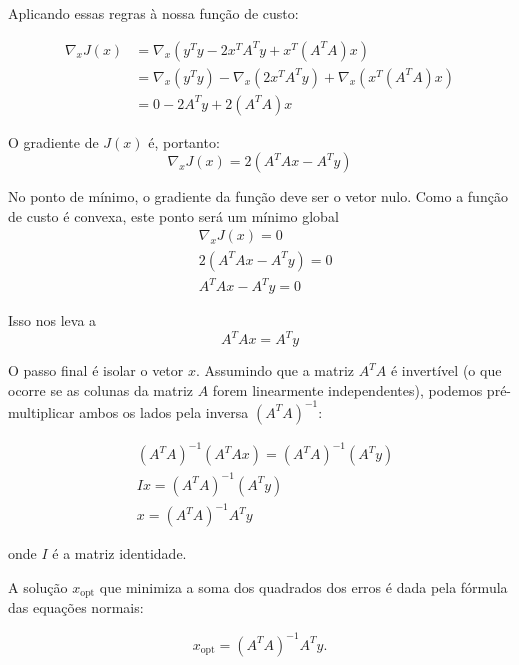 	Aplicando essas regras à nossa função de custo:
	
	\begin{align*}
		\nabla_x J(x) &= \nabla_x (y^T y - 2x^T A^T y + x^T (A^T A) x) \\
		&= \nabla_x(y^T y) - \nabla_x(2x^T A^T y) + \nabla_x(x^T (A^T A) x) \\
		&= 0 - 2A^T y + 2(A^T A)x
	\end{align*}
	
	O gradiente de $J(x)$ é, portanto:
	$$
	\nabla_x J(x) = 2(A^T Ax - A^T y)
	$$
	
	No ponto de mínimo, o gradiente da função deve ser o vetor nulo. Como a função de custo é convexa, este ponto será um mínimo global 
	\begin{align*}
		& \nabla_x J(x) = 0 \\
		& 2(A^T Ax - A^T y) = 0 \\
		& A^T Ax - A^T y = 0
	\end{align*}
	
	Isso nos leva a
	$$
	A^T Ax = A^T y
	$$
	
	O passo final é isolar o vetor $x$. Assumindo que a matriz $A^T A$ é invertível (o que ocorre se as colunas da matriz $A$ forem linearmente independentes), podemos pré-multiplicar ambos os lados pela inversa $(A^T A)^{-1}$:
	
	\begin{align*}
		& (A^T A)^{-1} (A^T Ax) = (A^T A)^{-1} (A^T y) \\
		& I x = (A^T A)^{-1} (A^T y) \\
		& x = (A^T A)^{-1} A^T y
	\end{align*}
	
	onde $I$ é a matriz identidade.
	
	A solução $x_{\text{opt}}$ que minimiza a soma dos quadrados dos erros é dada pela fórmula das equações normais:
	
	$$
	x_{\text{opt}} = (A^T A)^{-1} A^T y.
	$$
	
